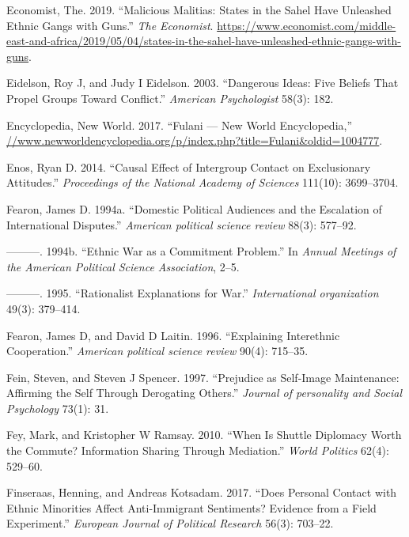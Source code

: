 \documentclass[11pt]{article}
\begin{document}
\leavevmode\hypertarget{ref-economist2019militias}{}%
Economist, The. 2019. ``Malicious Malitias: States in the Sahel Have
Unleashed Ethnic Gangs with Guns.'' \emph{The Economist}.
\url{https://www.economist.com/middle-east-and-africa/2019/05/04/states-in-the-sahel-have-unleashed-ethnic-gangs-with-guns}.

\leavevmode\hypertarget{ref-eidelson2003dangerous}{}%
Eidelson, Roy J, and Judy I Eidelson. 2003. ``Dangerous Ideas: Five
Beliefs That Propel Groups Toward Conflict.'' \emph{American
Psychologist} 58(3): 182.

\leavevmode\hypertarget{ref-fulanisize2017}{}%
Encyclopedia, New World. 2017. ``Fulani --- New World Encyclopedia,''
\url{//www.newworldencyclopedia.org/p/index.php?title=Fulani\&oldid=1004777}.

\leavevmode\hypertarget{ref-enos2014causal}{}%
Enos, Ryan D. 2014. ``Causal Effect of Intergroup Contact on
Exclusionary Attitudes.'' \emph{Proceedings of the National Academy of
Sciences} 111(10): 3699--3704.

\leavevmode\hypertarget{ref-fearon1994domestic}{}%
Fearon, James D. 1994a. ``Domestic Political Audiences and the
Escalation of International Disputes.'' \emph{American political science
review} 88(3): 577--92.

\leavevmode\hypertarget{ref-fearon1994ethnic}{}%
---------. 1994b. ``Ethnic War as a Commitment Problem.'' In
\emph{Annual Meetings of the American Political Science Association},
2--5.

\leavevmode\hypertarget{ref-fearon1995rationalist}{}%
---------. 1995. ``Rationalist Explanations for War.''
\emph{International organization} 49(3): 379--414.

\leavevmode\hypertarget{ref-fearon1996explaining}{}%
Fearon, James D, and David D Laitin. 1996. ``Explaining Interethnic
Cooperation.'' \emph{American political science review} 90(4): 715--35.

\leavevmode\hypertarget{ref-fein1997prejudice}{}%
Fein, Steven, and Steven J Spencer. 1997. ``Prejudice as Self-Image
Maintenance: Affirming the Self Through Derogating Others.''
\emph{Journal of personality and Social Psychology} 73(1): 31.

\leavevmode\hypertarget{ref-fey2010shuttle}{}%
Fey, Mark, and Kristopher W Ramsay. 2010. ``When Is Shuttle Diplomacy
Worth the Commute? Information Sharing Through Mediation.'' \emph{World
Politics} 62(4): 529--60.

\leavevmode\hypertarget{ref-finseraas2017does}{}%
Finseraas, Henning, and Andreas Kotsadam. 2017. ``Does Personal Contact
with Ethnic Minorities Affect Anti-Immigrant Sentiments? Evidence from a
Field Experiment.'' \emph{European Journal of Political Research} 56(3):
703--22.
\end{document}
